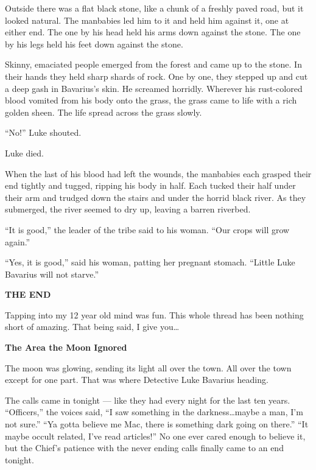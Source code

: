 Outside there was a flat black stone, like a chunk of a freshly
paved road, but it looked natural. The manbabies led him to it and
held him against it, one at either end. The one by his head held
his arms down against the stone. The one by his legs held his feet
down against the stone.

Skinny, emaciated people emerged from the forest and came up to the
stone. In their hands they held sharp shards of rock. One by one,
they stepped up and cut a deep gash in Bavarius's skin. He screamed
horridly. Wherever his rust-colored blood vomited from his body
onto the grass, the grass came to life with a rich golden sheen.
The life spread across the grass slowly.

``No!'' Luke shouted.

Luke died.

When the last of his blood had left the wounds, the manbabies each
grasped their end tightly and tugged, ripping his body in half.
Each tucked their half under their arm and trudged down the stairs
and under the horrid black river. As they submerged, the river
seemed to dry up, leaving a barren riverbed.

``It is good,'' the leader of the tribe said to his woman. ``Our crops
will grow again.''

``Yes, it is good,'' said his woman, patting her pregnant stomach.
``Little Luke Bavarius will not starve.''



{\bf THE END} 
 





Tapping into my 12 year old mind was fun. This whole thread has
been nothing short of amazing. That being said, I give you{\ldots}



{\bf The Area the Moon Ignored}



The moon was glowing, sending its light all over the town. All over
the town except for one part. That was where Detective Luke
Bavarius heading.



The calls came in tonight --- like they had every night for the
last ten years. ``Officers,'' the voices said, ``I
saw something in the darkness{\ldots}maybe a man, I'm not sure.''
``Ya gotta believe me Mac, there is something dark going on
there.'' ``It maybe occult related, I've read
articles!'' No one ever cared enough to believe it, but the
Chief's patience with the never ending calls finally came to an end
tonight.



